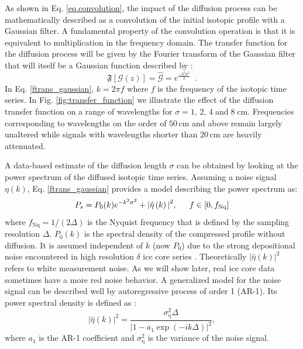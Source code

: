 \documentclass[11pt, draftcls, onecolumn]{IEEEtran} %
\numberwithin{equation}{section}
\numberwithin{table}{section}
\numberwithin{figure}{section}
\begin{document}
As shown in Eq. \ref{eq.convolution}, the impact of the diffusion process can be mathematically 
described as a convolution of the initial isotopic profile with a Gaussian filter.
A fundamental property of the convolution operation is that it is equivalent to  multiplication
in the frequency domain. The transfer function for the diffusion process will be given by the
Fourier transform of the Gaussian filter that will itself be a Gaussian function described by 
\citep{Abramowitz1964, Gkinis2014}:
\begin{equation}
\label{ftrans_gaussian}
\mathfrak{F}
[ \mathcal{G} (z) ] =
\hat{\mathcal{G}} = {e}^{\frac{-k^2 \sigma^2}{2}} {} \enspace .
\end{equation}%
In Eq. \ref{ftrans_gaussian}, $k = 2\pi f$ where $f$ is the frequency of the 
isotopic time series. 
In Fig. \ref{fig:transfer_function} we illustrate the effect of the diffusion transfer function on a range of wavelengths
for $\sigma = 1,\, 2,\, 4\; \mathrm{and} \;8 \;	\mathrm{cm.}$ 
Frequencies corresponding to wavelengths on the order of $50\,\mathrm{cm}$ and above remain largely unaltered while signals with 
wavelengths shorter than $20\,\mathrm{cm}$ are heavily attenuated. 


A data-based estimate of the diffusion length $\sigma$ can be obtained by looking at the power spectrum of the diffused 
isotopic time series. Assuming a noise signal $\eta \left( k \right)$, 
Eq. \ref{ftrans_gaussian} provides a model describing the power spectrum as: 
\begin{equation}
P_s =    P_0(k) {e}^{-k^2 \sigma^2} + {\vert \hat{\eta} \left( k \right) \vert} ^{2}, \indent f \in \left[0,f_{\mathrm{Nq}}\right]
\label{eq:powerspectrum}
\end{equation}
where $f_{\mathrm{Nq}} = 1 /\left(2\Delta\right)$ is the Nyquist frequency that is defined by the sampling resolution $\Delta$.
$P_0(k)$ is the spectral density of the compressed profile without diffusion. 
It is assumed independent of $k$ (now $P_0$) due to the strong depositional noise 
encountered in high resolution $\delta$ ice core series \citep{Johnsen2000}. 
Theoretically $|\hat{\eta}(k )|^2$ refers to white measurement noise.
As we will show later, real ice core data sometimes have a more red noise behavior.
A generalized model for the noise signal can be described well by autoregressive process of order 1 (AR-1).
Its power spectral density is defined as \citep{Kay1981}:
\begin{equation}
|\hat{\eta}(k )|^2 = \frac{\sigma_{\mathrm{\eta}}^2 \Delta}
 {\left| 1-a_1 \exp{\left( -i k  \Delta \right) } \right|^2} {},
\end{equation}
where $a_1$ is the AR-1 coefficient and $\sigma_{\mathrm{\eta}}^2$ is the variance of the noise signal.
\end{document}
